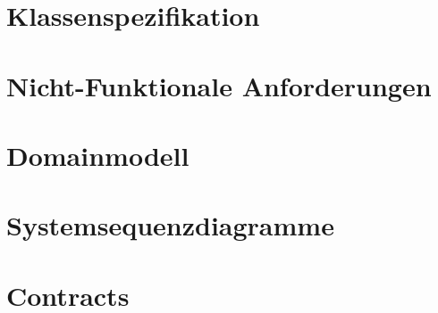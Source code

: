\documentclass[a4paper,12pt,halfparskip,DIV14]{scrreprt}
\begin{document}
\chapter{Klassenspezifikation}\label{cha:klassenspezifikation} %


\chapter{Nicht-Funktionale Anforderungen}\label{cha:nicht_funktionale_anforderungen} %


\chapter{Domainmodell}\label{cha:domainmodell} %


\chapter{Systemsequenzdiagramme}\label{cha:systemsequenzdiagramme} %


\chapter{Contracts}\label{cha:contracts} %

\end{document}
